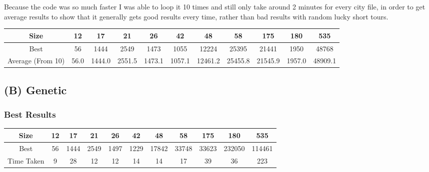 \documentclass[11pt]{article}
\begin{document}
			\par
			Because the code was so much faster I was able to loop it 10 times and still only take around 2 minutes for every city file, in order to get average results to show that it generally gets good results every time, rather than bad results with random lucky short tours.
		\begin{center}
			\begin{tabular}{| c | c | c | c | c | c | c | c | c | c | c |}
				\hline
				Size & 12 & 17 & 21 & 26 & 42 & 48 & 58 & 175 & 180 & 535 \\
				\hline
				 Best & 56 & 1444 & 2549 & 1473 & 1055 & 12224 & 25395 & 21441 & 1950 & 48768 \\
				\hline
				Average (From 10) & 56.0 & 1444.0 & 2551.5 & 1473.1 & 1057.1 & 12461.2 & 25455.8 & 21545.9 & 1957.0 & 48909.1 \\
				\hline		
			\end{tabular}
		\end{center}
	
	
	\subsection*{(B) Genetic}
	
		\subsubsection*{Best Results}
			\begin{center}
				\begin{tabular}{| c | c | c | c | c | c | c | c | c | c | c |}
					\hline
					Size & 12 & 17 & 21 & 26 & 42 & 48 & 58 & 175 & 180 & 535 \\
					\hline
					Best & 56 & 1444 & 2549 & 1497 & 1229 & 17842 & 33748 & 33623 & 232050 & 114461 \\
					\hline
					Time Taken & 9 & 28 & 12 & 12 & 14 & 14 & 17 & 39 & 36 & 223 \\
					\hline			
				\end{tabular}
			\end{center}
		
\end{document}
